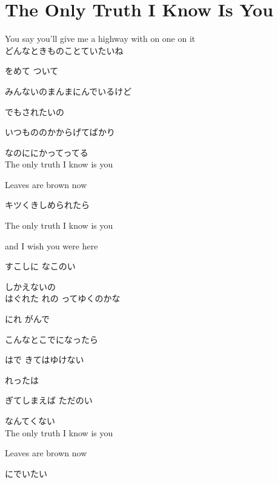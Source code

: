 \section{ The Only Truth I Know Is You}
\large{

You say you'll give me a highway with on one on it
\\

どんなときものことていたいね

をめて ついて

みんないのまんまにんでいるけど

でもされたいの

いつもののかからげてばかり

なのににかってってる
\\

The only truth I know is you

Leaves are brown now

キツくきしめられたら

The only truth I know is you

and I wish you were here

すこしに なこのい

しかえないの
\\

はぐれた れの ってゆくのかな

にれ がんで

こんなとこでになったら

はで きてはゆけない

れったは

ぎてしまえば ただのい

なんてくない
\\

The only truth I know is you

Leaves are brown now

にでいたい

}
